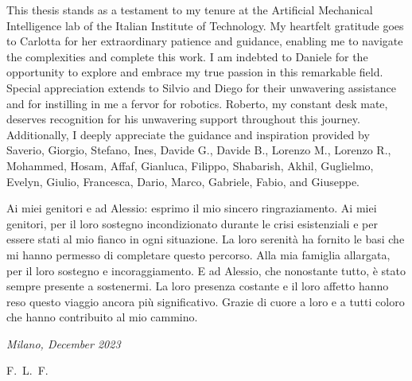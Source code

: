 \documentclass{Configuration_Files/PoliMi3i_thesis}
\begin{document}
This thesis stands as a testament to my tenure at the Artificial Mechanical Intelligence lab of the Italian Institute of Technology. My heartfelt gratitude goes to Carlotta for her extraordinary patience and guidance, enabling me to navigate the complexities and complete this work. I am indebted to Daniele for the opportunity to explore and embrace my true passion in this remarkable field. Special appreciation extends to Silvio and Diego for their unwavering assistance and for instilling in me a fervor for robotics. Roberto, my constant desk mate, deserves recognition for his unwavering support throughout this journey. Additionally, I deeply appreciate the guidance and inspiration provided by Saverio, Giorgio, Stefano, Ines, Davide G., Davide B., Lorenzo M., Lorenzo R., Mohammed, Hosam, Affaf, Gianluca, Filippo, Shabarish, Akhil, Guglielmo, Evelyn, Giulio, Francesca, Dario, Marco, Gabriele, Fabio, and Giuseppe.

Ai miei genitori e ad Alessio: esprimo il mio sincero ringraziamento. Ai miei genitori, per il loro sostegno incondizionato durante le crisi esistenziali e per essere stati al mio fianco in ogni situazione. La loro serenità ha fornito le basi che mi hanno permesso di completare questo percorso. Alla mia famiglia allargata, per il loro sostegno e incoraggiamento. E ad Alessio, che nonostante tutto, è stato sempre presente a sostenermi. La loro presenza costante e il loro affetto hanno reso questo viaggio ancora più significativo. Grazie di cuore a loro e a tutti coloro che hanno contribuito al mio cammino.


\noindent\textit{Milano, December 2023}

\begin{flushright}
    \hfill F.~L.~F.
\end{flushright}

\cleardoublepage
\end{document}
